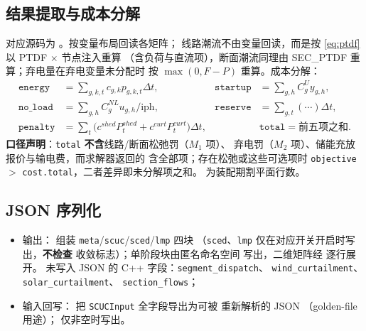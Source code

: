 \subsection{结果提取与成本分解}

对应源码为 。按变量布局回读各矩阵；
线路潮流不由变量回读，而是按 \eqref{eq:ptdf} 以 PTDF $\times$ 节点注入重算
（含负荷与直流项），断面潮流同理由 SEC\_PTDF 重算；弃电量在弃电变量未分配时
按 $\max(0,F-P)$ 重算。成本分解：
\begin{align}
\texttt{energy}&=\textstyle\sum_{g,k,t}c_{g,k}p_{g,k,t}\Delta t, &
\texttt{startup}&=\textstyle\sum_{g,h}C^U_g y_{g,h},\nonumber\\
\texttt{no\_load}&=\textstyle\sum_{g,h}C^{NL}_g u_{g,h}/\mathrm{iph}, &
\texttt{reserve}&=\textstyle\sum_{g,t}(\cdots)\Delta t,\nonumber\\
\texttt{penalty}&=\textstyle\sum_t\big(c^{shed}P^{shed}_t+c^{curt}P^{curt}_t\big)\Delta t,
&&\texttt{total}=\text{前五项之和}.\label{eq:impl-cost}
\end{align}
\textbf{口径声明}：\texttt{total} \textbf{不含}线路/断面松弛罚（$M_1$ 项）、
弃电罚（$M_2$ 项）、储能充放报价与输电费，而求解器返回的
 含全部项；存在松弛或这些可选项时
\texttt{objective} $>$ \texttt{cost.total}，二者差异即未分解项之和。
 为装配期割平面行数。

\subsection{JSON 序列化}

\begin{itemize}
  \item 输出： 组装
        \texttt{meta}/\texttt{scuc}/\texttt{sced}/\texttt{lmp} 四块
        （\texttt{sced}、\texttt{lmp} 仅在对应开关开启时写出，\textbf{不检查}
        收敛标志）；单阶段块由匿名命名空间
         写出，二维矩阵经
         逐行展开。
        未写入 JSON 的 C++ 字段：\texttt{segment\_dispatch}、
        \texttt{wind\_curtailment}、\texttt{solar\_curtailment}、
        \texttt{section\_flows}；
  \item 输入回写：
        把 \texttt{SCUCInput} 全字段导出为可被
         重新解析的 JSON
        （golden-file 用途）； 仅非空时写出。
\end{itemize}

